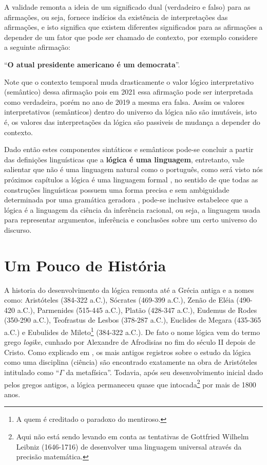 A validade remonta a ideia de um significado dual (verdadeiro e falso) para as afirmações, ou seja, fornece indícios da existência de interpretações das afirmações, e isto significa que existem diferentes significados para as afirmações a depender de um fator que pode ser chamado de contexto, por exemplo considere a seguinte afirmação: 

\begin{center}
	``\textbf{O atual presidente americano é um democrata}''.
\end{center}

Note que o contexto temporal muda drasticamente o valor lógico interpretativo (semântico) dessa afirmação pois em 2021 essa afirmação pode ser interpretada como verdadeira, porém no ano de 2019 a mesma era falsa. Assim os valores interpretativos (semânticos) dentro do universo da lógica não são imutáveis, isto é, os valores das interpretações da lógica são passiveis de mudança a depender do contexto.

Dado então estes componentes sintáticos e semânticos pode-se concluir a partir das definições linguísticas que a \textbf{lógica é uma linguagem}, entretanto, vale salientar que não é uma linguagem natural como o português, como será visto nós próximos capítulos a lógica é uma linguagem formal \cite{benjaLivro2010}, no sentido de que todas as construções linguísticas possuem uma forma precisa e sem ambiguidade determinada por uma gramática geradora \cite{hopcroft2008, linz2006},  pode-se inclusive estabelece que a lógica é a linguagem da ciência da inferência racional, ou seja, a linguagem usada para representar argumentos, inferência e conclusões sobre um certo universo do discurso.

\section{Um Pouco de História}\label{sec:Um-pouco-historia}

A historia do desenvolvimento da lógica remonta até a Grécia antiga e a nomes como: Aristóteles (384-322 a.C.), Sócrates (469-399 a.C.), Zenão de Eléia (490-420 a.C.), Parmenides (515-445 a.C.), Platão (428-347 a.C.), Eudemus de Rodes (350-290 a.C.), Teofrastus de Lesbos (378-287 a.C.), Euclides de Megara (435-365 a.C.) e  Eubulides de Mileto\footnote{A quem é creditado o paradoxo do mentiroso.} (384-322 a.C.). De fato o nome lógica vem do termo grego \textit{logike}, cunhado por Alexandre de Afrodisias no fim do século II depois de Cristo. Como explicado em \cite{abe2002-logica}, os mais antigos registros sobre o estudo da lógica como uma disciplina (ciência) são encontrado exatamente na obra de Aristóteles intitulado como ``$\Gamma$ da metafísica''. Todavia, após seu desenvolvimento inicial dado pelos gregos antigos, a lógica permaneceu quase que intocada\footnote{Aqui não está sendo levando em conta as tentativas de Gottfried Wilhelm Leibniz (1646-1716) de desenvolver uma linguagem universal através da precisão matemática.} por mais de 1800 anos.

